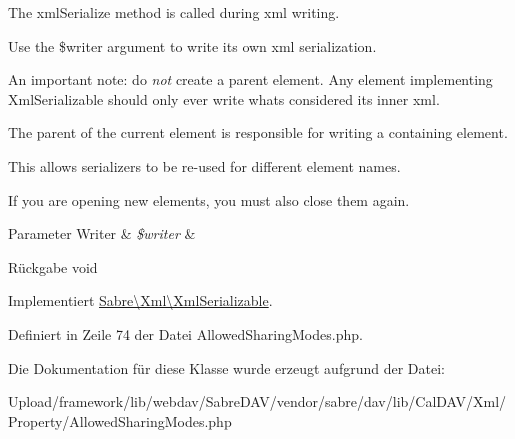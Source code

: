 The xml\+Serialize method is called during xml writing.

Use the \$writer argument to write its own xml serialization.

An important note\+: do {\itshape not} create a parent element. Any element implementing Xml\+Serializable should only ever write what\textquotesingle{}s considered its \textquotesingle{}inner xml\textquotesingle{}.

The parent of the current element is responsible for writing a containing element.

This allows serializers to be re-\/used for different element names.

If you are opening new elements, you must also close them again.


\begin{DoxyParams}[1]{Parameter}
Writer & {\em \$writer} & \\
\hline
\end{DoxyParams}
\begin{DoxyReturn}{Rückgabe}
void 
\end{DoxyReturn}


Implementiert \mbox{\hyperlink{interface_sabre_1_1_xml_1_1_xml_serializable_aa78f3ee43aa699be8347181653a53d8c}{Sabre\textbackslash{}\+Xml\textbackslash{}\+Xml\+Serializable}}.



Definiert in Zeile 74 der Datei Allowed\+Sharing\+Modes.\+php.



Die Dokumentation für diese Klasse wurde erzeugt aufgrund der Datei\+:\begin{DoxyCompactItemize}
\item 
Upload/framework/lib/webdav/\+Sabre\+D\+A\+V/vendor/sabre/dav/lib/\+Cal\+D\+A\+V/\+Xml/\+Property/Allowed\+Sharing\+Modes.\+php\end{DoxyCompactItemize}
